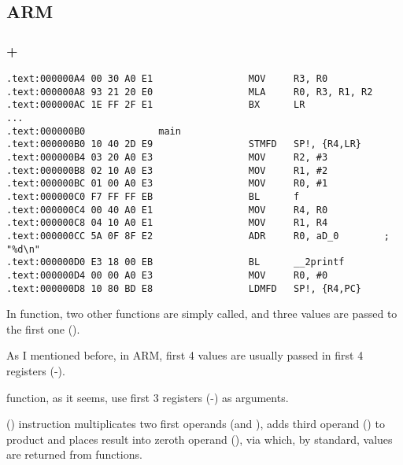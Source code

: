 ﻿\subsection{ARM}

\subsubsection{\NonOptimizingKeil + \ARMMode}

\begin{lstlisting}
.text:000000A4 00 30 A0 E1                 MOV     R3, R0
.text:000000A8 93 21 20 E0                 MLA     R0, R3, R1, R2
.text:000000AC 1E FF 2F E1                 BX      LR
...
.text:000000B0             main
.text:000000B0 10 40 2D E9                 STMFD   SP!, {R4,LR}
.text:000000B4 03 20 A0 E3                 MOV     R2, #3
.text:000000B8 02 10 A0 E3                 MOV     R1, #2
.text:000000BC 01 00 A0 E3                 MOV     R0, #1
.text:000000C0 F7 FF FF EB                 BL      f
.text:000000C4 00 40 A0 E1                 MOV     R4, R0
.text:000000C8 04 10 A0 E1                 MOV     R1, R4
.text:000000CC 5A 0F 8F E2                 ADR     R0, aD_0        ; "%d\n"
.text:000000D0 E3 18 00 EB                 BL      __2printf
.text:000000D4 00 00 A0 E3                 MOV     R0, #0
.text:000000D8 10 80 BD E8                 LDMFD   SP!, {R4,PC}
\end{lstlisting}

{In \main function, two other functions are simply called, and three values are passed to the 
first one ().}

{As I mentioned before, in ARM, first 4 values are usually passed in first 4 registers} (\Rzero-\Rthree).

{function, as it seems, use first 3 registers (\Rzero-\Rtwo) as arguments.}

 () 
{instruction multiplicates two first operands (\Rthree and \Rone), adds third operand (\Rtwo) to product and places
result into zeroth operand (\Rzero), via which, by standard, values are returned from functions.}

